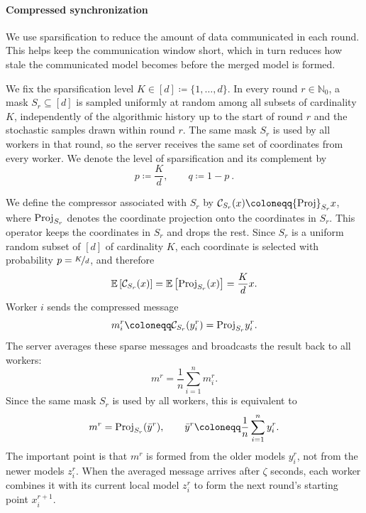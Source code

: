 \documentclass{article}
\newcommand{\bbN}{\mathbb{N}}
\newcommand{\eqdef}{\coloneqq}
\newcommand{\Exp}[1]{{\mathbb{E}} \left[ #1 \right]}
\newcommand{\Proj}{{\rm Proj}} %
\theoremstyle{plain}
\theoremstyle{definition}
\begin{document}
\paragraph{Compressed synchronization} %
\label{par:compressed_synchronization}

We use sparsification to reduce the amount of data communicated in each round.
This helps keep the communication window short, which in turn reduces how stale the communicated model becomes before the merged model is formed.

We fix the sparsification level $K \in [d] \eqdef \{1,\dots,d\}$.
In every round $r \in \bbN_0$, a mask $S_r \subseteq [d]$ is sampled uniformly at random among all subsets of cardinality $K$, independently of the algorithmic history up to the start of round $r$ and the stochastic samples drawn within round $r$.
The same mask \(S_r\) is used by all workers in that round, so the server receives the same set of coordinates from every worker.
We denote the level of sparsification and its complement by
\begin{equation}\label{eq:pq}%
    p \eqdef \frac{K}{d},
    \qquad
    q \eqdef 1-p ~.
\end{equation}

We define the compressor associated with $S_r$ by $\mathcal C_{S_r}(x) \eqdef \Proj_{S_r}x$, where $\Proj_{S_r}$ denotes the coordinate projection onto the coordinates in $S_r$. 
This operator keeps the coordinates in \(S_r\) and drops the rest.
Since $S_r$ is a uniform random subset of $[d]$ of cardinality $K$, each coordinate is selected with probability $p=\nicefrac{K}{d}$, and therefore
$$%
    \Exp{\mathcal C_{S_r}(x)} = \Exp{\Proj_{S_r}(x)} = \frac Kd x.
$$
Worker \(i\) sends the compressed message
$$%
    m_i^r \eqdef \mathcal C_{S_r}(y_i^r)=\Proj_{S_r}y_i^r.
$$
The server averages these sparse messages and broadcasts the result back to all workers:
$$%
    m^r = \frac{1}{n}\sum_{i=1}^n m_i^r.
$$
Since the same mask $S_r$ is used by all workers, this is equivalent to
\begin{equation*}%
    m^r = \Proj_{S_r} (\bar{y}^r),
    \qquad
    \bar y^r \eqdef \frac{1}{n}\sum_{i=1}^n y_i^r.    
\end{equation*}
The important point is that \(m^r\) is formed from the older models \(y_i^r\), not from the newer models \(z_i^r\).
When the averaged message arrives after \(\zeta\) seconds, each worker combines it with its current local model \(z_i^r\) to form the next round's starting point \(x_i^{r+1}\).
% 
\end{document}
